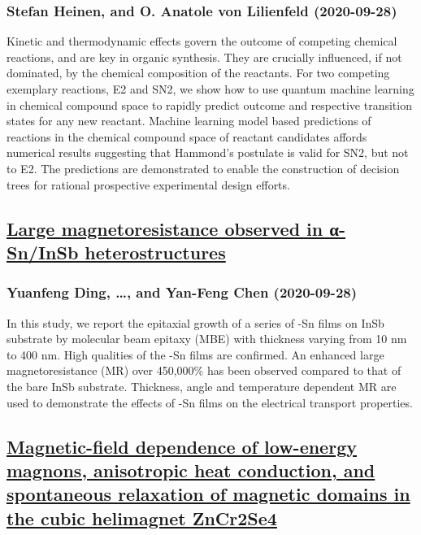 \subsubsection*{Stefan Heinen, and O. Anatole von Lilienfeld (2020-09-28)}
Kinetic and thermodynamic effects govern the outcome of competing chemical
reactions, and are key in organic synthesis. They are crucially influenced, if
not dominated, by the chemical composition of the reactants. For two competing
exemplary reactions, E2 and SN2, we show how to use quantum machine learning in
chemical compound space to rapidly predict outcome and respective transition
states for any new reactant. Machine learning model based predictions of
reactions in the chemical compound space of reactant candidates affords
numerical results suggesting that Hammond's postulate is valid for SN2, but not
to E2. The predictions are demonstrated to enable the construction of decision
trees for rational prospective experimental design efforts.

\subsection*{\href{http://arxiv.org/abs/2009.13427v1}{Large magnetoresistance observed in α-Sn/InSb heterostructures}}
\subsubsection*{Yuanfeng Ding, \dots, and Yan-Feng Chen (2020-09-28)}
In this study, we report the epitaxial growth of a series of {\alpha}-Sn
films on InSb substrate by molecular beam epitaxy (MBE) with thickness varying
from 10 nm to 400 nm. High qualities of the {\alpha}-Sn films are confirmed. An
enhanced large magnetoresistance (MR) over 450,000\% has been observed compared
to that of the bare InSb substrate. Thickness, angle and temperature dependent
MR are used to demonstrate the effects of {\alpha}-Sn films on the electrical
transport properties.

\subsection*{\href{http://arxiv.org/abs/2009.13424v1}{Magnetic-field dependence of low-energy magnons, anisotropic heat  conduction, and spontaneous relaxation of magnetic domains in the cubic  helimagnet ZnCr2Se4}}
